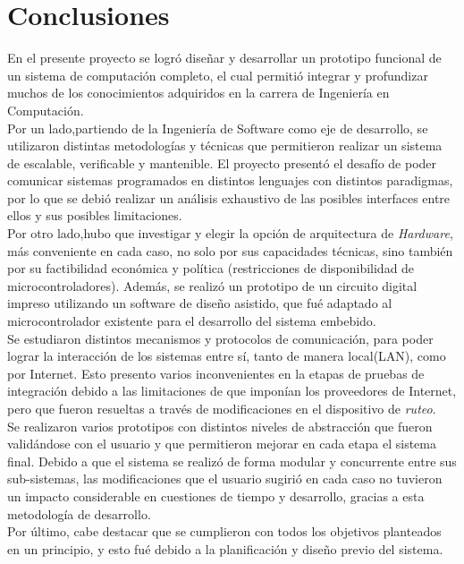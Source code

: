 
\chapter{Conclusiones} %

\label{Chapter6} %


En el presente proyecto se logró diseñar y desarrollar un prototipo funcional de un sistema de computación completo, el cual permitió integrar y profundizar muchos de los conocimientos adquiridos en la carrera de Ingeniería en Computación.\\
Por un lado,partiendo de la Ingeniería de Software como eje de desarrollo, se utilizaron distintas metodologías y técnicas que permitieron realizar un sistema de escalable, verificable y mantenible. El proyecto presentó el desafío de poder comunicar sistemas programados en distintos lenguajes con distintos paradigmas, por lo que se debió realizar un análisis exhaustivo de las posibles interfaces entre ellos y sus posibles limitaciones. \\
Por otro lado,hubo que investigar y elegir la opción de arquitectura de \textit{Hardware}, más conveniente en cada caso, no solo por sus capacidades técnicas, sino también por su factibilidad económica y política (restricciones de disponibilidad de microcontroladores). Además, se realizó un prototipo de un circuito digital impreso utilizando un software de diseño asistido, que fué adaptado al microcontrolador existente para el desarrollo del sistema embebido.\\
Se estudiaron distintos mecanismos y protocolos de comunicación, para poder lograr la interacción de los sistemas entre sí, tanto de manera local(LAN), como por Internet. Esto presento varios inconvenientes en la etapas de pruebas de integración debido a las limitaciones de que imponían los proveedores de Internet, pero que fueron resueltas a través de modificaciones en el dispositivo de \textit{ruteo}.\\
Se realizaron varios prototipos con distintos niveles de abstracción que fueron validándose con el usuario y que permitieron mejorar en cada etapa el sistema final. Debido a que el sistema se realizó de forma modular y concurrente entre sus sub-sistemas, las modificaciones que el usuario sugirió en cada caso no tuvieron un impacto considerable en cuestiones de tiempo y desarrollo, gracias a esta metodología de desarrollo.\\
Por último, cabe destacar que se cumplieron con todos los objetivos planteados en un principio, y esto fué debido a la planificación y diseño previo del sistema. 


